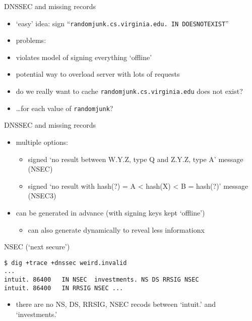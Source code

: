 
\begin{frame}{DNSSEC and missing records}
    \begin{itemize}
    \item `easy' idea: sign ``\texttt{randomjunk.cs.virginia.edu. IN DOESNOTEXIST}''
    \vspace{.5cm}
    \item problems:
    \item violates model of signing everything `offline'
    \item potential way to overload server with lots of requests
    \item do we really want to cache \texttt{randomjunk.cs.virginia.edu} does not exist?
    \item \ldots for each value of \texttt{randomjunk}?
    \end{itemize}
\end{frame}

\begin{frame}{DNSSEC and missing records}
    \begin{itemize}
    \item multiple options:
        \begin{itemize}
        \item signed `no result between W.Y.Z, type Q and Z.Y.Z, type A' message (NSEC)
        \item signed `no result with hash(?) = A < hash(X) < B = hash(?)' message (NSEC3)
        \end{itemize}
    \item can be generated in advance  (with signing keys kept `offline')
        \begin{itemize}
        \item can also generate dynamically to reveal less informationx
        \end{itemize}
    \end{itemize}
\end{frame}

\begin{frame}[fragile]{NSEC (`next secure')}
\begin{Verbatim}[fontsize=\fontsize{9}{10}]
$ dig +trace +dnssec weird.invalid
...
intuit. 86400   IN NSEC  investments. NS DS RRSIG NSEC
intuit. 86400   IN RRSIG NSEC ...
\end{Verbatim}
\begin{itemize}
\item there are no NS, DS, RRSIG, NSEC recods between `intuit.' and `investments.'
\end{itemize}
\end{frame}

